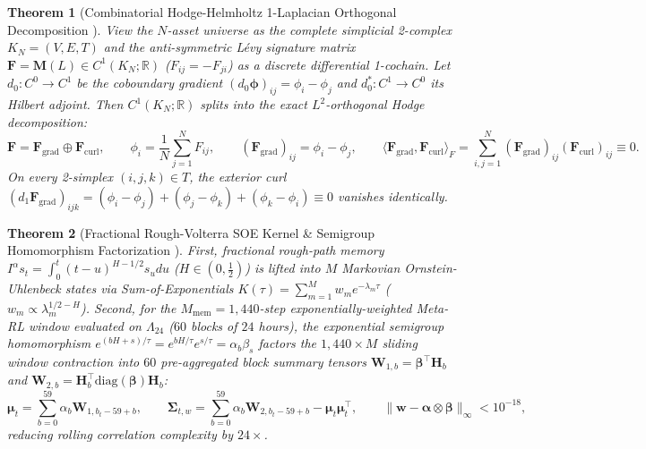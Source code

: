 \documentclass[10pt,a4paper]{article}
\newtheorem{theorem}{Theorem}[section]
\begin{document}
\begin{theorem}[Combinatorial Hodge-Helmholtz 1-Laplacian Orthogonal Decomposition \cite{lim2020}]
View the $N$-asset universe as the complete simplicial 2-complex $K_N = (V, E, T)$ and the anti-symmetric Lévy signature matrix $\mathbf{F} = \mathbf{M}(L) \in C^1(K_N; \mathbb{R})$ ($F_{ij} = -F_{ji}$) as a discrete differential 1-cochain. Let $d_0: C^0 \to C^1$ be the coboundary gradient $(d_0 \boldsymbol{\phi})_{ij} = \phi_i - \phi_j$ and $d_0^*: C^1 \to C^0$ its Hilbert adjoint. Then $C^1(K_N; \mathbb{R})$ splits into the exact $L^2$-orthogonal Hodge decomposition:
\begin{equation}
  \mathbf{F} = \mathbf{F}_{\mathrm{grad}} \oplus \mathbf{F}_{\mathrm{curl}}, \qquad \phi_i = \frac{1}{N}\sum_{j=1}^N F_{ij}, \qquad (\mathbf{F}_{\mathrm{grad}})_{ij} = \phi_i - \phi_j, \qquad \langle \mathbf{F}_{\mathrm{grad}}, \mathbf{F}_{\mathrm{curl}} \rangle_F = \sum_{i,j=1}^N (\mathbf{F}_{\mathrm{grad}})_{ij}(\mathbf{F}_{\mathrm{curl}})_{ij} \equiv 0.
\end{equation}
On every 2-simplex $(i, j, k) \in T$, the exterior curl $(d_1 \mathbf{F}_{\mathrm{grad}})_{ijk} = (\phi_i - \phi_j) + (\phi_j - \phi_k) + (\phi_k - \phi_i) \equiv 0$ vanishes identically.
\end{theorem}

\begin{theorem}[Fractional Rough-Volterra SOE Kernel \& Semigroup Homomorphism Factorization \cite{gatheral2018}]
First, fractional rough-path memory $I^\alpha s_t = \int_0^t (t-u)^{H-1/2} s_u du$ ($H \in (0, \frac{1}{2})$) is lifted into $M$ Markovian Ornstein-Uhlenbeck states via Sum-of-Exponentials $K(\tau) = \sum_{m=1}^M w_m e^{-\lambda_m \tau}$ ($w_m \propto \lambda_m^{1/2-H}$). Second, for the $M_{\mathrm{mem}} = 1,440$-step exponentially-weighted Meta-RL window evaluated on $\Lambda_{24}$ ($60$ blocks of $24$ hours), the exponential semigroup homomorphism $e^{(bH+s)/\tau} = e^{bH/\tau} e^{s/\tau} = \alpha_b \beta_s$ factors the $1,440 \times M$ sliding window contraction into $60$ pre-aggregated block summary tensors $\mathbf{W}_{1,b} = \boldsymbol{\beta}^\top \mathbf{H}_b$ and $\mathbf{W}_{2,b} = \mathbf{H}_b^\top \mathrm{diag}(\boldsymbol{\beta})\mathbf{H}_b$:
\begin{equation}
  \boldsymbol{\mu}_t = \sum_{b=0}^{59} \alpha_b \mathbf{W}_{1, b_t - 59 + b}, \qquad \boldsymbol{\Sigma}_{t, w} = \sum_{b=0}^{59} \alpha_b \mathbf{W}_{2, b_t - 59 + b} - \boldsymbol{\mu}_t \boldsymbol{\mu}_t^\top, \qquad \|\mathbf{w} - \boldsymbol{\alpha} \otimes \boldsymbol{\beta}\|_\infty < 10^{-18},
\end{equation}
reducing rolling correlation complexity by $24\times$.
\end{theorem}
\end{document}
